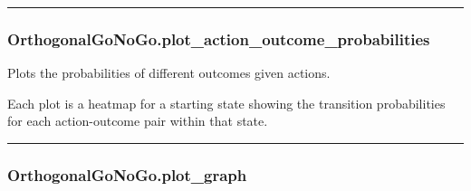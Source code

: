 \begin{center}\rule{0.5\linewidth}{\linethickness}\end{center}

\hypertarget{orthogonalgonogo.plot_action_outcome_probabilities}{%
\subsubsection{OrthogonalGoNoGo.plot\_action\_outcome\_probabilities}\label{orthogonalgonogo.plot_action_outcome_probabilities}}

\begin{Shaded}
\begin{Highlighting}[]
\OperatorTok{=}\OperatorTok{=}\OperatorTok{=}\OperatorTok{=}\NormalTok{)}
\end{Highlighting}
\end{Shaded}

Plots the probabilities of different outcomes given actions.

Each plot is a heatmap for a starting state showing the transition
probabilities for each action-outcome pair within that state.

\begin{center}\rule{0.5\linewidth}{\linethickness}\end{center}

\hypertarget{orthogonalgonogo.plot_graph}{%
\subsubsection{OrthogonalGoNoGo.plot\_graph}\label{orthogonalgonogo.plot_graph}}

\begin{Shaded}
\begin{Highlighting}[]
\OperatorTok{=}\OperatorTok{=}\OperatorTok{=}\OperatorTok{=}\OperatorTok{=}\OperatorTok{=}\OperatorTok{=}\OperatorTok{=}\NormalTok{)}
\end{Highlighting}
\end{Shaded}

